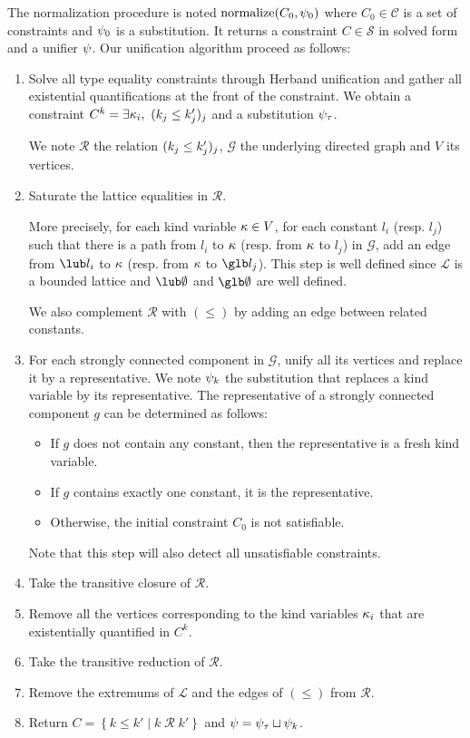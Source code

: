 The normalization procedure is noted $\operatorname{normalize}(C_0,\mathrm{\psi}_0)$ where
$C_0\in \mathcal C$ is a set of constraints and $\mathrm{\psi}_0$ is a substitution.
It returns a constraint $C \in \mathcal S$ in
solved form and a unifier $\mathrm{\psi}$.
Our unification algorithm proceed as follows:
\begin{enumerate}
\item Solve all type equality constraints through Herband unification and
  gather all existential quantifications at the front of the constraint.
  We obtain a constraint $C^k = \exists \kappa_i,\ (k_j \leq k'_j)_j$ and
  a substitution $\mathrm{\psi}_\tau$.
  
  We note $\mathcal R$ the relation $(k_j \leq k'_j)_j$,
  $\mathcal G$ the underlying directed graph and $V$ its vertices.

\item Saturate the lattice equalities in $\mathcal R$.
  
  More precisely, for each kind variable $\kappa \in V$,
  for each constant $l_i$ (resp. $l_j$) such that
  there is a path from $l_i$ to $\kappa$ (resp. from $\kappa$ to $l_j$) in $\mathcal G$,
  add an edge from $\lub l_i$ to $\kappa$
  (resp. from $\kappa$ to $\glb l_j$).
  This step is well defined since $\mathcal L$ is a bounded lattice
  and $\lub\emptyset$ and $\glb\emptyset$ are well defined.

  We also complement $\mathcal R$ with $(\leq)$ by adding an edge
  between related constants.
\item For each strongly connected component in $\mathcal G$, unify all its vertices and replace it by a representative.
  We note $\mathrm{\psi}_k$ the substitution that replaces a kind variable by
  its representative.
  The representative of a strongly connected component $g$ can be determined as follows:
  \begin{itemize}
  \item If $g$ does not contain any constant, then the representative
    is a fresh kind variable.
  \item If $g$ contains exactly one constant, it is the representative.
  \item Otherwise, the initial constraint $C_0$ is not satisfiable.
  \end{itemize}
  Note that this step will also detect all unsatisfiable constraints.
\item Take the transitive closure of $\mathcal R$.
\item Remove all the vertices corresponding to the kind variables $\kappa_i$
  that are existentially quantified in $C^k$.
\item Take the transitive reduction of $\mathcal R$.
\item Remove the extremums of $\mathcal L$ and the edges of $(\leq)$
  from $\mathcal R$.
\item Return $C = \left\{ k \leq k' \mid k \operatorname{\mathcal R}k' \right\}$
  and $\mathrm{\psi} =  \mathrm{\psi}_\tau \sqcup \mathrm{\psi}_k$.
\end{enumerate}

